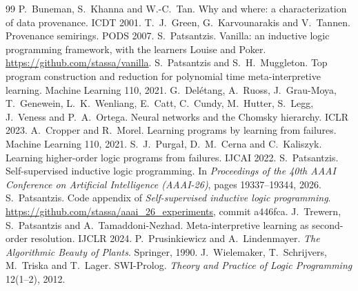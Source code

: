 \documentclass[11pt]{article}
\begin{document}
\begin{thebibliography}{99}
 P.~Buneman, S.~Khanna and W.-C.~Tan. Why and where: a characterization
  of data provenance. ICDT 2001.
 T.~J.~Green, G.~Karvounarakis and V.~Tannen. Provenance semirings.
  PODS 2007.
 S.~Patsantzis. Vanilla: an inductive logic programming framework,
  with the learners Louise and Poker. \url{https://github.com/stassa/vanilla}.
 S.~Patsantzis and S.~H.~Muggleton. Top program construction and
  reduction for polynomial time meta-interpretive learning. Machine Learning 110, 2021.
 G.~Del\'etang, A.~Ruoss, J.~Grau-Moya, T.~Genewein, L.~K.~Wenliang,
  E.~Catt, C.~Cundy, M.~Hutter, S.~Legg, J.~Veness and P.~A.~Ortega. Neural networks
  and the Chomsky hierarchy. ICLR 2023.
 A.~Cropper and R.~Morel. Learning programs by learning from
  failures. Machine Learning 110, 2021.
 S.~J.~Purga\l{}, D.~M.~Cerna and C.~Kaliszyk. Learning higher-order
  logic programs from failures. IJCAI 2022.
 S.~Patsantzis. Self-supervised inductive logic programming. In
  \emph{Proceedings of the 40th AAAI Conference on Artificial Intelligence
  (AAAI-26)}, pages 19337--19344, 2026.
 S.~Patsantzis. Code appendix of \emph{Self-supervised inductive
  logic programming}. \url{https://github.com/stassa/aaai_26_experiments}, commit
  a446fca.
 J.~Trewern, S.~Patsantzis and A.~Tamaddoni-Nezhad.
  Meta-interpretive learning as second-order resolution. IJCLR 2024.
 P.~Prusinkiewicz and A.~Lindenmayer. \emph{The Algorithmic Beauty of
  Plants}. Springer, 1990.
 J.~Wielemaker, T.~Schrijvers, M.~Triska and T.~Lager. SWI-Prolog.
  \emph{Theory and Practice of Logic Programming} 12(1--2), 2012.
\end{thebibliography}
\end{document}
